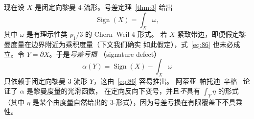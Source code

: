 \documentclass[11pt]{amsart}
\theoremstyle{definition}
\theoremstyle{remark}
\theoremstyle{plain}
\numberwithin{equation}{section}
\renewcommand{\:}{\colon}
\newcommand{\Ahat}{{\hat A}}
\DeclareMathOperator{\Sign}{Sign}
\newcommand{\bX}{\partial X}
\begin{document}
现在设 $X$ 是闭定向黎曼 4-流形。号差定理~\ref{thm:3} 给出
  \begin{equation}\label{eq:86}
     \Sign(X) = \int_{X}\omega , 
  \end{equation}
其中 $\omega$ 是有理示性类 $p_1/3$ 的 Chern–Weil 4-形式。
若 $X$ 紧致带边，即便假定黎曼度量在边界附近为乘积度量（下文我们确实
如此假定），式~\eqref{eq:86} 也未必成立。令 $Y=\bX$。于是\emph{号差亏损}
（signature defect）~\cite[\S10.3]{A7}
  \begin{equation}\label{eq:87}
     \alpha (Y)=\Sign(X) - \int_{X}\omega 
  \end{equation}
只依赖于闭定向黎曼 3-流形 $Y$，这由~\eqref{eq:86} 容易推出。
阿蒂亚–帕托迪–辛格~\cite{APS1} 论证了 $\alpha$ 是黎曼度量的光滑函数，
在定向反向下变号，并且\emph{不}具有 $\int_{Y}\eta $ 的形式（其中 $\eta $
是某个由度量自然给出的 3-形式），因为号差亏损在有限覆盖下不具乘性。
\end{document}
